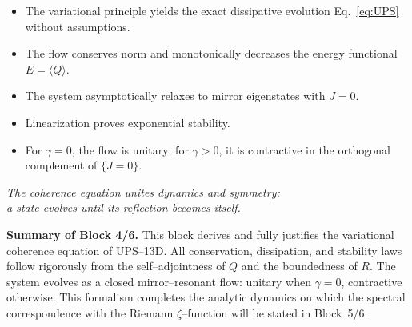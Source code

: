 \begin{itemize}
  \item The variational principle yields the exact dissipative evolution Eq.~\eqref{eq:UPS} without assumptions.
  \item The flow conserves norm and monotonically decreases the energy functional $E=\langle Q\rangle$.
  \item The system asymptotically relaxes to mirror eigenstates with $J=0$.
  \item Linearization proves exponential stability.
  \item For $\gamma=0$, the flow is unitary; for $\gamma>0$, it is contractive in the orthogonal complement of $\{J=0\}$.
\end{itemize}

\begin{flushright}
\textit{The coherence equation unites dynamics and symmetry:} \\
\textit{a state evolves until its reflection becomes itself.}
\end{flushright}


\noindent\textbf{Summary of Block 4/6.}
This block derives and fully justifies the variational coherence equation of UPS–13D.
All conservation, dissipation, and stability laws follow rigorously from the self–adjointness of $Q$ and the boundedness of $R$.
The system evolves as a closed mirror–resonant flow: unitary when $\gamma=0$, contractive otherwise.
This formalism completes the analytic dynamics on which the spectral correspondence with the Riemann $\zeta$–function will be stated in Block~5/6.



